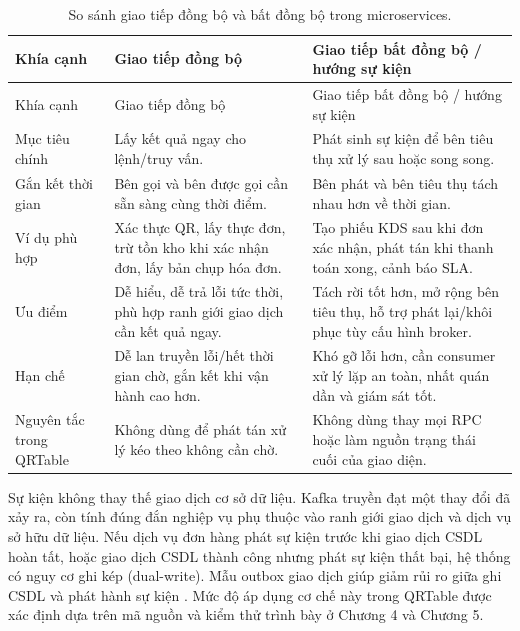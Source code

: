 {\footnotesize\sloppy
\setlength{\tabcolsep}{3pt}
\begin{longtable}{>{\raggedright\arraybackslash}p{}>{\raggedright\arraybackslash}p{}>{\raggedright\arraybackslash}p{}}
  \caption{So sánh giao tiếp đồng bộ và bất đồng bộ trong microservices.}
  \label{tab:chapter2-sync-async-communication}\\
  \toprule
  Khía cạnh & Giao tiếp đồng bộ & Giao tiếp bất đồng bộ / hướng sự kiện \\
  \midrule
  \endfirsthead
  \toprule
  Khía cạnh & Giao tiếp đồng bộ & Giao tiếp bất đồng bộ / hướng sự kiện \\
  \midrule
  \endhead
  \bottomrule
  \endfoot
  Mục tiêu chính & Lấy kết quả ngay cho lệnh/truy vấn. & Phát sinh sự kiện để bên tiêu thụ xử lý sau hoặc song song. \\
  \addlinespace
  Gắn kết thời gian & Bên gọi và bên được gọi cần sẵn sàng cùng thời điểm. & Bên phát và bên tiêu thụ tách nhau hơn về thời gian. \\
  \addlinespace
  Ví dụ phù hợp & Xác thực QR, lấy thực đơn, trừ tồn kho khi xác nhận đơn, lấy bản chụp hóa đơn. & Tạo phiếu KDS sau khi đơn xác nhận, phát tán khi thanh toán xong, cảnh báo SLA. \\
  \addlinespace
  Ưu điểm & Dễ hiểu, dễ trả lỗi tức thời, phù hợp ranh giới giao dịch cần kết quả ngay. & Tách rời tốt hơn, mở rộng bên tiêu thụ, hỗ trợ phát lại/khôi phục tùy cấu hình broker. \\
  \addlinespace
  Hạn chế & Dễ lan truyền lỗi/hết thời gian chờ, gắn kết khi vận hành cao hơn. & Khó gỡ lỗi hơn, cần consumer xử lý lặp an toàn, nhất quán dần và giám sát tốt. \\
  \addlinespace
  Nguyên tắc trong QRTable & Không dùng để phát tán xử lý kéo theo không cần chờ. & Không dùng thay mọi RPC hoặc làm nguồn trạng thái cuối của giao diện. \\
\end{longtable}
}

Sự kiện không thay thế giao dịch cơ sở dữ liệu. Kafka truyền đạt một thay đổi đã xảy ra, còn tính đúng đắn nghiệp vụ phụ thuộc vào ranh giới giao dịch và dịch vụ sở hữu dữ liệu. Nếu dịch vụ đơn hàng phát sự kiện trước khi giao dịch CSDL hoàn tất, hoặc giao dịch CSDL thành công nhưng phát sự kiện thất bại, hệ thống có nguy cơ ghi kép (dual-write). Mẫu outbox giao dịch giúp giảm rủi ro giữa ghi CSDL và phát hành sự kiện \cite{richardson-microservices-patterns-2018}. Mức độ áp dụng cơ chế này trong QRTable được xác định dựa trên mã nguồn và kiểm thử trình bày ở Chương 4 và Chương 5.

